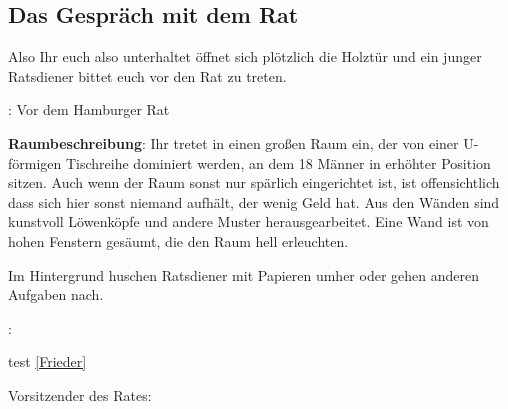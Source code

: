 \subsection{Das Gespräch mit dem Rat}

Also Ihr euch also unterhaltet öffnet sich plötzlich die Holztür und ein junger Ratsdiener bittet euch vor den Rat zu treten.

: Vor dem Hamburger Rat

\textbf{Raumbeschreibung}: Ihr tretet in einen großen Raum ein, der von einer U-förmigen Tischreihe dominiert werden, an dem 18 Männer in erhöhter Position sitzen. Auch wenn der Raum sonst nur spärlich eingerichtet ist, ist offensichtlich dass sich hier sonst niemand aufhält, der wenig Geld hat. Aus den Wänden sind kunstvoll Löwenköpfe und andere Muster herausgearbeitet. Eine Wand ist von hohen Fenstern gesäumt, die den Raum hell erleuchten.

Im Hintergrund huschen Ratsdiener mit Papieren umher oder gehen anderen Aufgaben nach.


:

test \ref{Frieder}

Vorsitzender des Rates:
